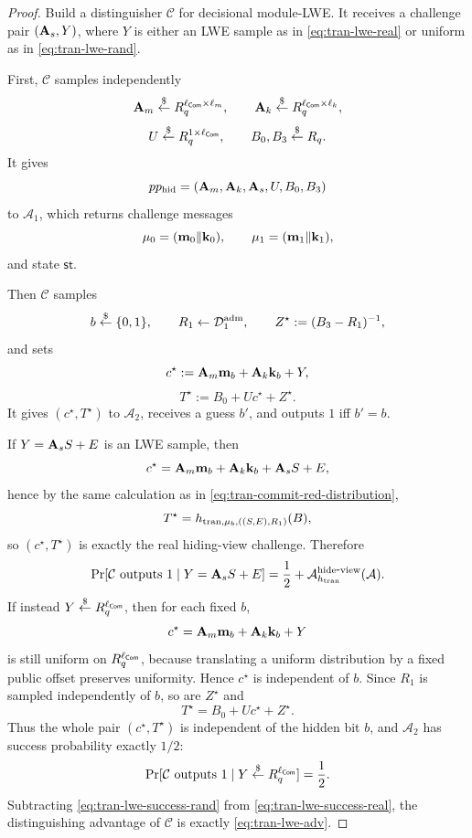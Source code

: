 \begin{proof}
Build a distinguisher \(\mathcal C\) for decisional module-LWE. It receives a challenge pair
\((\mathbf{A}_s,Y)\), where \(Y\) is either an LWE sample as in \eqref{eq:tran-lwe-real} or uniform as in
\eqref{eq:tran-lwe-rand}.

First, \(\mathcal C\) samples independently
\[
\mathbf{A}_m\overset{\$}{\leftarrow} R_q^{\ell_{\mathsf{Com}}\times \ell_m},\qquad
\mathbf{A}_k\overset{\$}{\leftarrow} R_q^{\ell_{\mathsf{Com}}\times \ell_k},
\]
\[
U\overset{\$}{\leftarrow} R_q^{1\times \ell_{\mathsf{Com}}},\qquad B_0,B_3\overset{\$}{\leftarrow} R_q.
\]
It gives
\[
pp_{\mathrm{hid}}=(\mathbf{A}_m,\mathbf{A}_k,\mathbf{A}_s,U,B_0,B_3)
\]
to \(\mathcal A_1\), which returns challenge messages
\[
\mathbf{\mu}_0=(\mathbf{m}_0\Vert \mathbf{k}_0),\qquad \mathbf{\mu}_1=(\mathbf{m}_1\Vert \mathbf{k}_1),
\]
and state \(\mathsf{st}\).

Then \(\mathcal C\) samples
\[
b\overset{\$}{\leftarrow}\{0,1\},\qquad R_1\gets \mathcal D_1^{\mathrm{adm}},\qquad Z^\star := (B_3-R_1)^{-1},
\]
and sets
\begin{equation}\label{eq:tran-lwe-commitment}
c^\star := \mathbf{A}_m\mathbf{m}_b + \mathbf{A}_k\mathbf{k}_b + Y,
\end{equation}
\begin{equation}\label{eq:tran-lwe-target}
T^\star := B_0 + Uc^\star + Z^\star.
\end{equation}
It gives \((c^\star,T^\star)\) to \(\mathcal A_2\), receives a guess \(b'\), and outputs \(1\) iff
\(b'=b\).

If \(Y=\mathbf{A}_sS+E\) is an LWE sample, then
\[
c^\star = \mathbf{A}_m\mathbf{m}_b + \mathbf{A}_k\mathbf{k}_b + \mathbf{A}_sS + E,
\]
hence by the same calculation as in \eqref{eq:tran-commit-red-distribution},
\[
T^\star = h_{\mathrm{tran},\mathbf{\mu}_b,((S,E),R_1)}(B),
\]
so \((c^\star,T^\star)\) is exactly the real hiding-view challenge. Therefore
\begin{equation}\label{eq:tran-lwe-success-real}
\Pr[\mathcal C \text{ outputs }1 \mid Y=\mathbf{A}_sS+E]
=
\frac12 + \mathcal{A}^{\mathrm{hide\mbox{-}view}}_{h_{\mathrm{tran}}}(\mathcal A).
\end{equation}
If instead \(Y\overset{\$}{\leftarrow} R_q^{\ell_{\mathsf{Com}}}\), then for each fixed \(b\),
\[
c^\star = \mathbf{A}_m\mathbf{m}_b + \mathbf{A}_k\mathbf{k}_b + Y
\]
is still uniform on \(R_q^{\ell_{\mathsf{Com}}}\), because translating a uniform distribution by a fixed public
offset preserves uniformity. Hence \(c^\star\) is independent of \(b\). Since \(R_1\) is sampled independently of
\(b\), so are \(Z^\star\) and
\[
T^\star = B_0 + Uc^\star + Z^\star.
\]
Thus the whole pair \((c^\star,T^\star)\) is independent of the hidden bit \(b\), and \(\mathcal A_2\) has
success probability exactly \(1/2\):
\begin{equation}\label{eq:tran-lwe-success-rand}
\Pr[\mathcal C \text{ outputs }1 \mid Y\overset{\$}{\leftarrow} R_q^{\ell_{\mathsf{Com}}}]
=
\frac12.
\end{equation}
Subtracting \eqref{eq:tran-lwe-success-rand} from \eqref{eq:tran-lwe-success-real}, the distinguishing
advantage of \(\mathcal C\) is exactly \eqref{eq:tran-lwe-adv}.
\end{proof}

